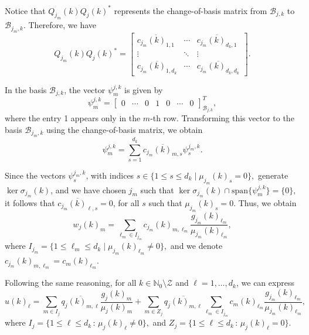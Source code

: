 \documentclass{amsart}
\theoremstyle{definition}
\theoremstyle{remark}
\numberwithin{equation}{section}
\begin{document}
	Notice that $Q_{j_m}(k)Q_j(k)^*$ represents the change-of-basis matrix from $\mathcal{B}_{j,k}$ to $\mathcal{B}_{j_m,k}$. Therefore, we have
	\begin{equation*}
		Q_{j_m}(k)Q_j(k)^*=
		\begin{bmatrix}
			\overline{c_{j_m}(k)_{1,1}} & \cdots & \overline{c_{j_m}(k)_{d_k,1}}\\
			\vdots & \ddots & \vdots\\
			\overline{c_{j_m}(k)_{1,d_k}} & \cdots & \overline{c_{j_m}(k)_{d_k,d_k}}
		\end{bmatrix}.
	\end{equation*}
	
	In the basis $\mathcal{B}_{j,k}$, the vector $\psi_m^{j,k}$ is given by  
	\begin{equation*}
		\psi_{m}^{j,k}=\begin{bmatrix} 0 & \cdots & 0 & 1 & 0 & \cdots & 0 \end{bmatrix}_{\mathcal{B}_{j,k}}^T,
	\end{equation*}
	where the entry 1 appears only in the $m$-th row. Transforming this vector to the basis $\mathcal{B}_{j_m,k}$ using the change-of-basis matrix, we obtain  
	\begin{equation*}
		\psi_m^{j,k} = \sum_{s=1}^{d_k}\overline{c_{j_m}(k)_{m,s}}\psi_{s}^{j_m,k}.
	\end{equation*}
	
	Since the vectors $\psi_s^{j_m,k}$, with indices $s\in\{1\leq s\leq d_k \mid \mu_{j_m}(k)_s=0\},$ 
	generate $\ker\sigma_{j_m}(k)$, and we have chosen $j_m$ such that $		\ker\sigma_{j_m}(k) \cap \text{span}\{\psi_{m}^{j,k}\} = \{0\},$ it follows that  $\overline{c_{j_m}(k)_{\ell,s}}=0$, for all $s$ such that $ \mu_{j_m}(k)_s=0.$ Thus, we obtain  
	\begin{equation*}
		w_j(k)_m = \sum_{\ell_m\in I_{j_m}}c_{j_m}(k)_{m,\ell_m}\dfrac{g_{j_m}(k)_{\ell_m}}{\mu_{j_m}(k)_{\ell_m}},
	\end{equation*}
	where  $I_{j_m}=\{1\leq\ell_m\leq d_k \mid \mu_{j_m}(k)_{\ell_m}\neq 0\},$ and we denote  
	$c_{j_m}(k)_{m,\ell_m}=c_m(k)_{\ell_m}.$
		
	Following the same reasoning, for all $k\in\mathbb{N}_0\setminus\mathcal{Z}$ and $\ell=1,\dots,d_k$, we can express  
	\begin{equation}\label{ucgmu}
		\widehat{u}(k)_\ell = \sum_{m\in I_j}\overline{q_j(k)_{m,\ell}}\dfrac{g_j(k)_m}{\mu_j(k)_m}+\sum_{m\in Z_j}\overline{q_j(k)_{m,\ell}}\sum_{\ell_m\in I_{j_m}}c_m(k)_{\ell_m}\dfrac{g_{j_m}(k)_{\ell_m}}{\mu_{j_m}(k)_{\ell_m}},
	\end{equation}
	where  $I_j=\{1\leq\ell\leq d_k\,:\, \mu_j(k)_\ell\neq 0\},$ and $Z_j=\{1\leq\ell\leq d_k\,:\, \mu_j(k)_\ell= 0\}.$
	
\end{document}
